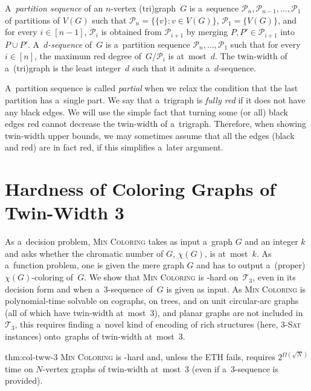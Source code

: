 \documentclass[a4paper,USenglish,cleveref,hyperref,autoref]{lipics-v2021}
\newcommand{\chr}{\textsc{Min Coloring}\xspace}
\begin{document}
A~\emph{partition sequence} of an $n$-vertex (tri)graph~$G$ is a~sequence $\mathcal P_n, \mathcal P_{n-1}, \ldots, \mathcal P_1$ of partitions of $V(G)$ such that $\mathcal P_n = \{\{v\}:v \in V(G)\}$, $\mathcal P_1 = \{V(G)\}$, and for every $i \in [n-1]$, $\mathcal P_i$ is obtained from $\mathcal P_{i+1}$ by merging $P, P' \in \mathcal P_{i+1}$ into $P \cup P'$.
A~\emph{$d$-sequence} of~$G$ is a~partition sequence $\mathcal P_n, \ldots, \mathcal P_1$ such that for every $i \in [n]$, the maximum red degree of~$G/\mathcal P_i$ is at~most~$d$.
The twin-width of a~(tri)graph is the least integer~$d$ such that it admits a~$d$-sequence.

A~partition sequence is called \emph{partial} when we relax the condition that the last partition has a~single part.
We say that a~trigraph is \emph{fully red} if it does not have any black edges.
We will use the simple fact that turning some (or all) black edges red cannot decrease the twin-width of a~trigraph.
Therefore, when showing twin-width upper bounds, we may sometimes assume that all the edges (black and red) are in fact red, if this simplifies a~later argument.

\section{Hardness of Coloring Graphs of Twin-Width 3}\label{sec:col-tww-3}

As a~decision problem, \chr takes as input a~graph $G$ and an integer $k$ and asks whether the chromatic number of $G$, $\chi(G)$, is at~most~$k$.
As a~function problem, one is given the mere graph $G$ and has to output a~(proper) $\chi(G)$-coloring of~$G$.
We show that \chr is \NP-hard on~$\mathcal T_3$, even in its decision form and when a~3-sequence of~$G$ is given as input.
As \chr is polynomial-time solvable on cographs, on trees, and on unit circular-arc graphs (all of which have twin-width at~most~3), and planar graphs are not included in~$\mathcal T_3$, this requires finding a~novel kind of encoding of rich structures (here, \textsc{3-Sat} instances) onto~graphs of twin-width at~most~3.   

\begin{reptheorem}{thm:col-tww-3}
  \chr is \NP-hard and, unless the ETH fails, requires $2^{\Omega(\sqrt{N})}$ time on $N$-vertex graphs of twin-width at~most~3 (even if a~3-sequence is provided). 
\end{reptheorem}
\end{document}
